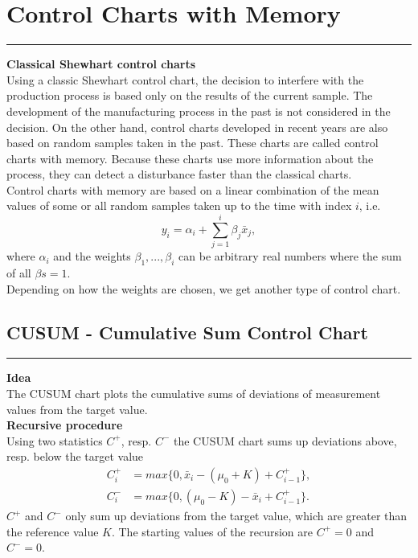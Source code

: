 \section{Control Charts with Memory}
\noindent\rule[\linienAbstand]{\linewidth}{\linienDickeDick}

\textbf{Classical Shewhart control charts}\\
Using a classic Shewhart control chart, the decision to interfere with the production process is based only on the results of the current sample.
The development of the manufacturing process in the past is not considered in the decision. On the other hand, control charts developed in recent years are also based on random samples taken in the past.
These charts are called control charts with memory.
Because these charts use more information about the process, they can detect a disturbance faster than the classical charts.\\

Control charts with memory are based on a linear combination of the mean values of some or all random samples taken up to the time with index $i$, i.e.
\begin{equation}
 y_i = \alpha_i + \sum_{j=1}^i \beta_j \bar{x}_j,
\end{equation}
where $\alpha_i$ and the weights $\beta_1, ..., \beta_i$ can be arbitrary real numbers where the sum of all $\beta s = 1$.\\
Depending on how the weights are chosen, we get another type of control chart.

\subsection{CUSUM - Cumulative Sum Control Chart}
\noindent\rule[\linienAbstand]{\linewidth}{\linienDicke}
\textbf{Idea}\\
The CUSUM chart plots the cumulative sums of deviations of measurement values from the target value.\\

\textbf{Recursive procedure}\\
Using two statistics $C^+$, resp. $C^-$ the CUSUM chart sums up deviations above, resp. below the target value
\begin{equation}
  \begin{split}
    C^+_i &= max\{0, \bar{x}_i - (\mu_0 + K) + C_{i-1}^+\},\\
    C^-_i &= max\{0, (\mu_0 - K) - \bar{x}_i + C_{i-1}^+\}.
  \end{split}
\end{equation}
$C^+$ and $C^-$ only sum up deviations from the target value, which are greater than the reference value $K$.
The starting values of the recursion are $C^+ = 0$ and $C^- = 0$.\\

